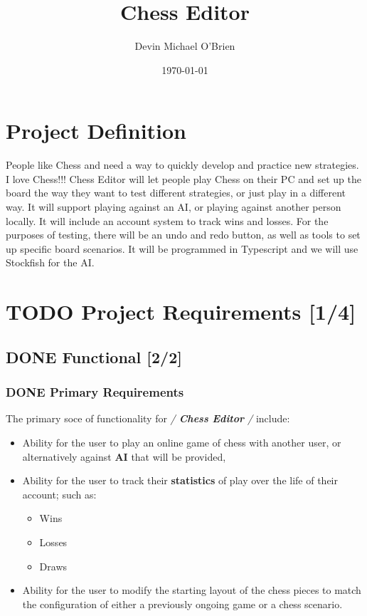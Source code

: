 \documentclass[11pt]{article}
\author{Devin Michael O'Brien}
\date{\today}
\title{Chess Editor}
\begin{document}
\maketitle
\tableofcontents

\section{Project Definition}
\label{sec:orgb20949e}
People like Chess and need a way to quickly develop and practice new strategies. I love
Chess!!! Chess Editor will let people play Chess on their PC and set up the board the
way they want to test different strategies, or just play in a different way. It will support
playing against an AI, or playing against another person locally. It will include an account
system to track wins and losses. For the purposes of testing, there will be an undo and
redo button, as well as tools to set up specific board scenarios. It will be programmed in
Typescript and we will use Stockfish for the AI.
\section{{\bfseries\sffamily TODO} Project Requirements [1/4]}
\label{sec:orgfb85e42}
\subsection{{\bfseries\sffamily DONE} Functional [2/2]}
\label{sec:orgdbf309f}
\subsubsection{{\bfseries\sffamily DONE} Primary Requirements}
\label{sec:org54f4998}
The primary soce of functionality for \emph{/ \textbf{Chess Editor} /} include:
\begin{itemize}
\item Ability for the user to play an online game of chess with
another user, or alternatively against \textbf{AI} that will be
provided,
\item Ability for the user to track their \textbf{statistics} of play over
the life of their account; such as:
\begin{itemize}
\item Wins
\item Losses
\item Draws
\end{itemize}
\item Ability for the user to modify the starting layout of the chess
pieces to match the configuration of either a previously ongoing
game or a chess scenario.
\end{itemize}
\end{document}
